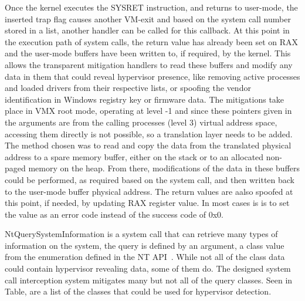Once the kernel executes the SYSRET instruction, and returns to user-mode, the inserted trap flag causes another VM-exit and based on the system call number stored in a list, 
another handler can be called for this callback. At this point in the execution path of system calls, the return value has already been set on RAX and the user-mode buffers 
have been written to, if required, by the kernel. This allows the transparent mitigation handlers to read these buffers and modify any data in them 
that could reveal hypervisor presence, like removing active processes and loaded drivers from their respective lists, 
or spoofing the vendor identification in Windows registry key or firmware data.
The mitigations take place in VMX root mode, operating at level -1 and since these pointers given in the arguments are from the calling processes (level 3) virtual address space, 
accessing them directly is not possible, so a translation layer needs to be added. The method chosen was to read and copy the data from the translated physical address to a spare memory buffer, 
either on the stack or to an allocated non-paged memory on the heap. From there, modifications of the data in these buffers could be performed, as required based on the system call, 
and then written back to the user-mode buffer physical address.
The return values are aalso spoofed at this point, if needed, by updating RAX register value. In most cases is is to set the value as an error code instead of the success code of 0x0. 

NtQuerySystemInformation is a system call that can retrieve many types of information on the system, the query is defined by an argument, 
a class value from the  enumeration defined in the NT API~\cite{ntdll-lib}. 
While not all of the class data could contain hypervisor revealing data, some of them do. The designed system call interception system mitigates many 
but not all of the query classes. Seen in Table, are a list of the  classes that could be used for hypervisor detection.

